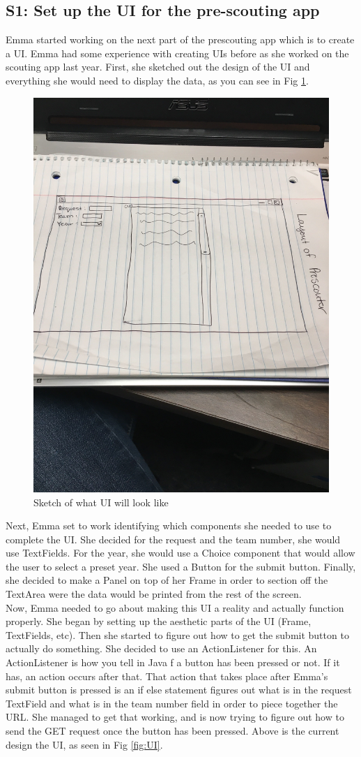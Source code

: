 \documentclass{article}
\begin{document}
\subsection{S1: Set up the UI for the pre-scouting app}

Emma started working on the next part of the prescouting app which is to create a UI. Emma had some experience with creating UIs before as she worked on the scouting app last year. First, she sketched out the design of the UI and everything she would need to display the data, as you can see in Fig \ref{fig:sketch}. \\

\begin{figure}
    \centering
    \includegraphics[width=.6 \textwidth]{24_02-11/images/sketchofUI.JPG}
    \caption{Sketch of what UI will look like}
    \label{fig:sketch}
\end{figure}

Next, Emma set to work identifying which components she needed to use to complete the UI. She decided for the request and the team number, she would use TextFields. For the year, she would use a Choice component that would allow the user to select a preset year. She used a Button for the submit button. Finally, she decided to make a Panel on top of her Frame in order to section off the TextArea were the data would be printed from the rest of the screen. \\

Now, Emma needed to go about making this UI a reality and actually function properly. She began by setting up the aesthetic parts of the UI (Frame, TextFields, etc). Then she started to figure out how to get the submit button to actually do something. She decided to use an ActionListener for this. An ActionListener is how you tell in Java f a button has been pressed or not. If it has, an action occurs after that. That action that takes place after Emma's submit button is pressed is an if else statement figures out what is in the request TextField and what is in the team number field in order to piece together the URL. She managed to get that working, and is now trying to figure out how to send the GET request once the button has been pressed. Above is the current design the UI, as seen in Fig \ref{fig:UI}.
\end{document}
